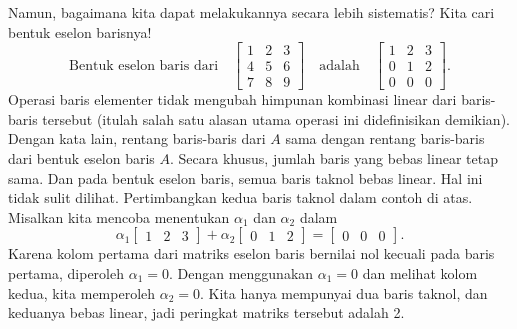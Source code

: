 Namun, bagaimana kita dapat melakukannya secara lebih sistematis? Kita cari bentuk eselon
barisnya!
\begin{equation*}
\text{Bentuk eselon baris dari}
\quad
\begin{bmatrix}
1 & 2 & 3 \\
4 & 5 & 6  \\
7 & 8 & 9
\end{bmatrix}
\quad
\text{adalah}
\quad
\begin{bmatrix}
1 & 2 & 3 \\
0 & 1 & 2  \\
0 & 0 & 0
\end{bmatrix} .
\end{equation*}
Operasi baris elementer tidak mengubah himpunan kombinasi linear dari
baris-baris tersebut (itulah salah satu alasan utama operasi ini didefinisikan demikian).
Dengan kata lain, rentang baris-baris dari $A$ sama
dengan rentang baris-baris dari bentuk eselon baris $A$.
Secara khusus, jumlah baris yang bebas linear tetap sama.
Dan pada bentuk eselon baris, semua baris taknol bebas linear.
Hal ini tidak sulit dilihat.
Pertimbangkan kedua baris taknol dalam contoh di atas.
Misalkan kita
mencoba menentukan $\alpha_1$ dan $\alpha_2$
dalam
\begin{equation*}
\alpha_1
\begin{bmatrix}
1 & 2 & 3
\end{bmatrix}
+
\alpha_2
\begin{bmatrix}
0 & 1 & 2
\end{bmatrix} =
\begin{bmatrix}
0 & 0 & 0
\end{bmatrix} .
\end{equation*}
Karena kolom pertama
dari matriks eselon baris bernilai nol kecuali pada baris pertama, diperoleh
$\alpha_1 = 0$. Dengan menggunakan $\alpha_1=0$ dan melihat kolom
kedua, kita memperoleh $\alpha_2=0$.
Kita hanya mempunyai dua baris taknol,
dan keduanya bebas linear, jadi peringkat matriks tersebut adalah 2.

